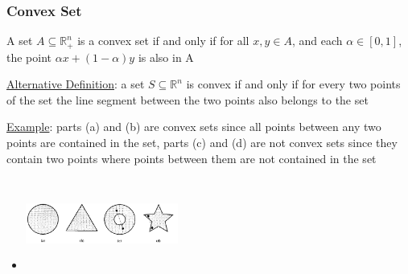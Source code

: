 \documentclass{article}
\begin{document}
\subsubsection{Convex Set}
A set $A \subseteq \mathbb{R}_{+}^{n}$ is a convex set if and only if for all $x, y \in A$, and each $\alpha \in [0,1]$, the point $\alpha x + (1- \alpha)y$ is also in A \par \vspace{0.3em}
  \underline{Alternative Definition}: a set $S \subseteq \mathbb{R}^{n}$ is convex if and only if for every two points of the set the line segment between the two points also belongs to the set
  \par
  \underline{Example}: parts (a) and (b) are convex sets since all points between any two points are contained in the set, parts (c) and (d) are not convex sets since they contain two points where points between them are not contained in the set
  \begin{itemize}
    \item  \includegraphics[width=5cm, height=3cm]{pic8}
  \end{itemize}
  \par
\vspace{6mm}
\end{document}

